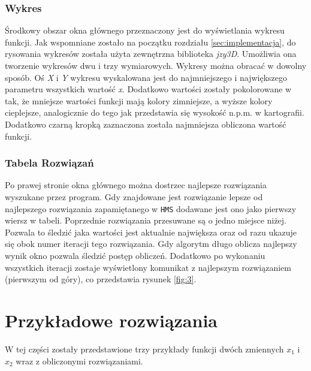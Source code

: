 \documentclass[10pt, a4paper]{article}
\begin{document}
\subsubsection{Wykres}
\label{subsubsec:wykres}
Środkowy obszar okna głównego przeznaczony jest do wyświetlania wykresu funkcji. Jak wspomniane zostało na początku rozdziału \ref{sec:implementacja}, do rysowania wykresów została użyta zewnętrzna biblioteka {\em jzy3D}. Umożliwia ona tworzenie wykresów dwu i trzy wymiarowych.  Wykresy można obracać w dowolny sposób. Oś {\em X} i {\em Y} wykresu wyskalowana jest do najmniejszego i największego parametru wszystkich wartość {\em x}. Dodatkowo wartości zostały pokolorowane w tak, że mniejsze wartości funkcji mają kolory zimniejsze, a wyższe kolory cieplejsze, analogicznie do tego jak przedstawia się wysokość n.p.m. w kartografii. Dodatkowo czarną kropką zaznaczona została najmniejsza obliczona wartość funkcji. 

\subsubsection{Tabela Rozwiązań}
\label{subsubsec:rozwiazania}
Po prawej stronie okna głównego można dostrzec najlepsze rozwiązania wyszukane przez program. Gdy znajdowane jest rozwiązanie lepsze od najlepszego rozwiązania zapamiętanego w {\tt HMS} dodawane jest ono jako pierwszy wiersz w tabeli. Poprzednie rozwiązania przesuwane są o jedno miejsce niżej. Pozwala to śledzić jaka wartości jest aktualnie największa oraz od razu ukazuje się obok numer iteracji tego rozwiązania. Gdy algorytm długo oblicza najlepszy wynik okno pozwala śledzić postęp obliczeń. Dodatkowo po wykonaniu wszystkich iteracji zostaje wyświetlony komunikat z najlepszym rozwiązaniem (pierwszym od góry), co przedstawia rysunek \ref{fig:3}.

\section{Przykładowe rozwiązania}
\label{sec:przyklady}
W tej części zostały przedstawione trzy przykłady funkcji dwóch zmiennych {\em $x_{1}$} i {\em $x_{2}$} wraz z obliczonymi rozwiązaniami. 
\end{document}
